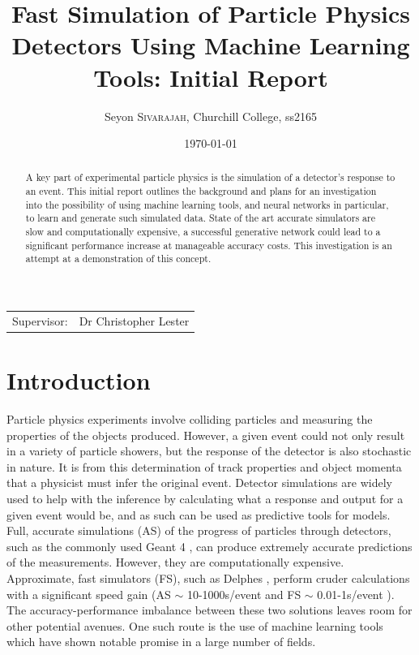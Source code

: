 \documentclass{article}
\title{Fast Simulation of Particle Physics Detectors Using Machine Learning Tools: Initial Report}
\author{Seyon \textsc{Sivarajah}, Churchill College, ss2165}
\date{\today}
\begin{document}
\maketitle


\begin{center}
\begin{tabular}{lr}


Supervisor: & Dr Christopher Lester\\

\end{tabular}
\end{center}



\begin{abstract}
A key part of experimental particle physics is the simulation of a detector's response to an event. This initial report outlines the background and plans for an investigation into the possibility of using machine learning tools, and neural networks in particular, to learn and generate such simulated data. State of the art accurate simulators are slow and computationally expensive, a successful generative network could lead to a significant performance increase at manageable accuracy costs. This investigation is an attempt at a demonstration of this concept.
\end{abstract}

\section{Introduction}

Particle physics experiments involve colliding particles and measuring the properties of the objects produced. However, a given event could not only result in a variety of particle showers, but the response of the detector is also stochastic in nature. It is from this determination of track properties and object momenta that a physicist must infer the original event. Detector simulations are widely used to help with the inference by calculating what a response and output for a given event would be, and as such can be used as predictive tools for models.\\

Full, accurate simulations (AS) of the progress of particles through detectors, such as the commonly used Geant 4 \cite{geant4}, can produce extremely accurate predictions of the measurements. However, they are computationally expensive. Approximate, fast simulators (FS), such as Delphes \cite{delphes}, perform cruder calculations with a significant speed gain (AS $\sim$ 10-1000s/event and FS $\sim$ 0.01-1s/event \cite{delphessl}). The accuracy-performance imbalance between these two solutions leaves room for other potential avenues. One such route is the use of machine learning tools which have shown notable promise in a large number of fields.\\
\end{document}

